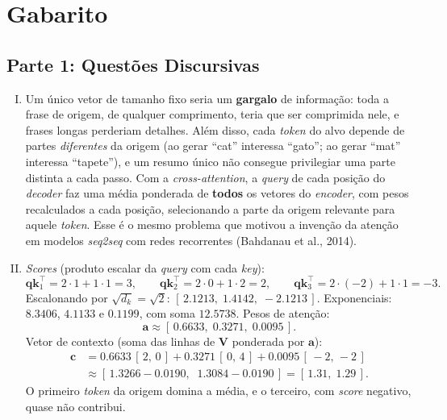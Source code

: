 \documentclass{dlproblemset}
\begin{document}
\newpage
\section*{Gabarito}
\color{blue}

\subsection*{Parte 1: Questões Discursivas}

\begin{enumerate}[I)]

    \item Um único vetor de tamanho fixo seria um \textbf{gargalo} de informação: toda a frase de origem, de qualquer comprimento, teria que ser comprimida nele, e frases longas perderiam detalhes. Além disso, cada \textit{token} do alvo depende de partes \emph{diferentes} da origem (ao gerar ``cat'' interessa ``gato''; ao gerar ``mat'' interessa ``tapete''), e um resumo único não consegue privilegiar uma parte distinta a cada passo. Com a \textit{cross-attention}, a \textit{query} de cada posição do \textit{decoder} faz uma média ponderada de \textbf{todos} os vetores do \textit{encoder}, com pesos recalculados a cada posição, selecionando a parte da origem relevante para aquele \textit{token}. Esse é o mesmo problema que motivou a invenção da atenção em modelos \textit{seq2seq} com redes recorrentes (Bahdanau et al., 2014).

    \item \textit{Scores} (produto escalar da \textit{query} com cada \textit{key}):
    \[
        \mathbf{q}\mathbf{k}_1^\top = 2 \cdot 1 + 1 \cdot 1 = 3, \qquad
        \mathbf{q}\mathbf{k}_2^\top = 2 \cdot 0 + 1 \cdot 2 = 2, \qquad
        \mathbf{q}\mathbf{k}_3^\top = 2 \cdot (-2) + 1 \cdot 1 = -3.
    \]
    Escalonando por $\sqrt{d_k} = \sqrt{2}$: $[\,2.1213,\; 1.4142,\; -2.1213\,]$. Exponenciais: $8.3406$, $4.1133$ e $0.1199$, com soma $12.5738$. Pesos de atenção:
    \[
        \mathbf{a} \approx [\,0.6633,\; 0.3271,\; 0.0095\,].
    \]
    Vetor de contexto (soma das linhas de $\mathbf{V}$ ponderada por $\mathbf{a}$):
    \begin{align*}
        \mathbf{c} &= 0.6633\,[\,2,\,0\,] + 0.3271\,[\,0,\,4\,] + 0.0095\,[\,-2,\,-2\,] \\
        &\approx [\,1.3266 - 0.0190,\;\; 1.3084 - 0.0190\,] = [\,1.31,\; 1.29\,].
    \end{align*}
    O primeiro \textit{token} da origem domina a média, e o terceiro, com \textit{score} negativo, quase não contribui.


\end{enumerate}
\end{document}
